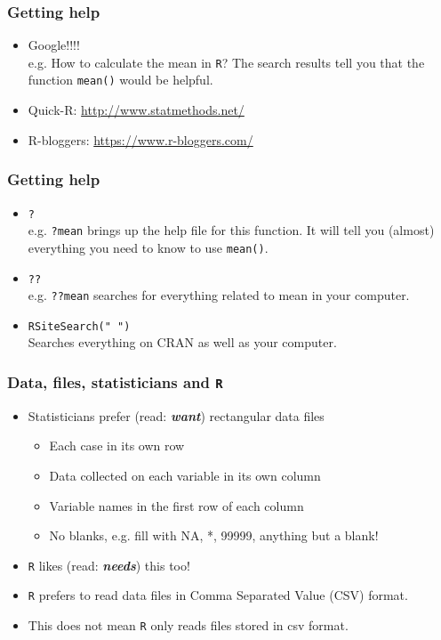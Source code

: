 \documentclass[handout]{beamer}\usepackage[]{graphicx}\usepackage[]{color}
\begin{document}
\begin{frame}
  \frametitle{Getting help}
  \begin{itemize}
  \item Google!!!!\\
    e.g. How to calculate the mean in \texttt{R}? The
    search results
    tell you that the function \texttt{mean()} would be helpful.
  \item Quick-R: \url{http://www.statmethods.net/}
  \item R-bloggers: \url{https://www.r-bloggers.com/}
  \end{itemize}
\end{frame}

\begin{frame}
  \frametitle{Getting help}
  \begin{itemize}
  \item \texttt{?} \\
  e.g. \texttt{?mean} brings up the help file for this function. It will tell
    you (almost) everything you need to know to use \texttt{mean()}.
   \item \texttt{??} \\
   e.g. \texttt{??mean} searches for everything related to mean in your computer.
   \item \texttt{RSiteSearch(" ")}\\
    Searches everything on CRAN as well as your computer.
  \end{itemize}
\end{frame}


\begin{frame}[fragile]
  \frametitle{Data, files, statisticians and \texttt{R}}
  \begin{itemize}
    \item Statisticians prefer (read: \textbf{\emph{want}}) rectangular data files
    \begin{itemize}
      \item Each case in its own row
      \item Data collected on each variable in its own column
      \item Variable names in the first row of each column
      \item No blanks, e.g. fill with NA, *, 99999, anything but a blank!
    \end{itemize}
    \item \texttt{R} likes (read: \textbf{\emph{needs}}) this too!
    \item \texttt{R} prefers to read data files in Comma Separated Value (CSV) format.
    \item This does not mean \texttt{R} only reads files stored in csv format.
  \end{itemize}
\end{frame}
\end{document}
